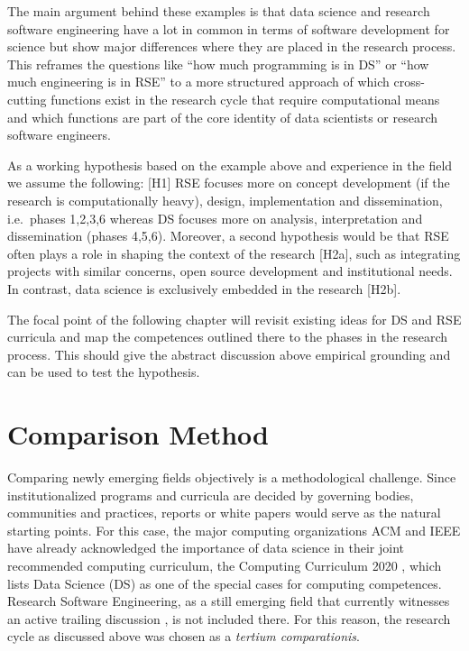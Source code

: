 \documentclass[
        english,biblatex
    ]{lni}
\begin{document}
    The main argument behind these examples is that data science and
    research software engineering have a lot in common in terms of
    software development for science but show major differences where
    they are placed in the research process. This reframes the questions
    like ``how much programming is in DS'' or ``how much engineering is
    in RSE'' to a more structured approach of which cross-cutting
    functions exist in the research cycle that require computational
    means and which functions are part of the core identity of data
    scientists or research software engineers.

    As a working hypothesis based on the example above and experience in
    the field we assume the following: {[}H1{]} RSE focuses more on
    concept development (if the research is computationally heavy),
    design, implementation and dissemination, i.e.~phases 1,2,3,6
    whereas DS focuses more on analysis, interpretation and
    dissemination (phases 4,5,6). Moreover, a second hypothesis would be
    that RSE often plays a role in shaping the context of the research
    {[}H2a{]}, such as integrating projects with similar concerns, open
    source development and institutional needs. In contrast, data
    science is exclusively embedded in the research {[}H2b{]}.

    The focal point of the following chapter will revisit existing ideas
    for DS and RSE curricula and map the competences outlined there to
    the phases in the research process. This should give the abstract
    discussion above empirical grounding and can be used to test the
    hypothesis.

    \section{Comparison Method}\label{comparison-method}

    Comparing newly emerging fields objectively is a methodological
    challenge. Since institutionalized programs and curricula are
    decided by governing bodies, communities and practices, reports or
    white papers would serve as the natural starting points. For this
    case, the major computing organizations ACM and IEEE have already
    acknowledged the importance of data science in their joint
    recommended computing curriculum, the Computing Curriculum 2020
    \autocite{CC2020}, which lists Data Science (DS) as one of the
    special cases for computing competences. Research Software
    Engineering, as a still emerging field that currently witnesses an
    active trailing discussion \autocite{Goth2024RSE}, is not included
    there. For this reason, the research cycle as discussed above was
    chosen as a \emph{tertium comparationis}.
\end{document}
